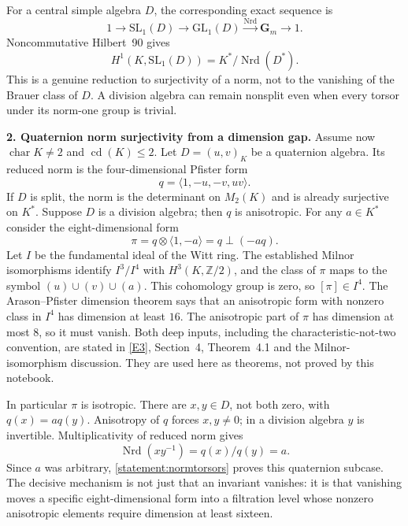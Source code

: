 \documentclass[11pt,a4paper]{article}
\newcommand{\Z}{\mathbb{Z}}
\newcommand{\eref}[2]{\hyperlink{extra:#1:#2}{[E#2]}}
\numberwithin{equation}{section}
\begin{document}
For a central simple algebra $D$, the corresponding exact sequence is
\[
 1\longrightarrow\mathrm{SL}_1(D)\longrightarrow\mathrm{GL}_1(D)
     \xrightarrow{\operatorname{Nrd}}\mathbf G_m\longrightarrow1.
\]
Noncommutative Hilbert~90 gives
\begin{equation}\label{statement:normtorsors}
 H^1(K,\mathrm{SL}_1(D))=K^*/\operatorname{Nrd}(D^*).
\end{equation}
This is a genuine reduction to surjectivity of a norm, not to the
vanishing of the Brauer class of $D$. A division algebra can remain
nonsplit even when every torsor under its norm-one group is trivial.

\textbf{2. Quaternion norm surjectivity from a dimension gap.}
Assume now $\operatorname{char}K\ne2$ and $\operatorname{cd}(K)\le2$.
Let $D=(u,v)_K$ be a quaternion algebra. Its reduced norm is the
four-dimensional Pfister form
\[
 q=\langle1,-u,-v,uv\rangle.
\]
If $D$ is split, the norm is the determinant on $M_2(K)$ and is already
surjective on $K^*$. Suppose $D$ is a division algebra; then $q$ is
anisotropic. For any $a\in K^*$ consider the eight-dimensional form
\[
 \pi=q\otimes\langle1,-a\rangle=q\perp(-a q).
\]
Let $I$ be the fundamental ideal of the Witt ring. The established
Milnor isomorphisms identify $I^3/I^4$ with
$H^3(K,\Z/2)$, and the class of $\pi$ maps to the symbol
$(u)\cup(v)\cup(a)$. This cohomology group is zero, so $[\pi]\in I^4$.
The Arason--Pfister dimension theorem says that an anisotropic form
with nonzero class in $I^4$ has dimension at least $16$.
The anisotropic part of $\pi$ has dimension at most $8$, so it must
vanish. Both deep inputs, including the characteristic-not-two
convention, are stated in \eref{statement}{3}, Section~4, Theorem~4.1 and the
Milnor-isomorphism discussion. They are used here as theorems, not
proved by this notebook.

In particular $\pi$ is isotropic. There are $x,y\in D$, not both zero,
with $q(x)=a q(y)$. Anisotropy of $q$ forces $x,y\ne0$; in a division
algebra $y$ is invertible. Multiplicativity of reduced norm gives
\begin{equation}\label{statement:ratio}
 \operatorname{Nrd}(xy^{-1})=q(x)/q(y)=a.
\end{equation}
Since $a$ was arbitrary, \eqref{statement:normtorsors} proves this quaternion
subcase. The decisive mechanism is not just that an invariant vanishes:
it is that vanishing moves a specific eight-dimensional form into a
filtration level whose nonzero anisotropic elements require dimension
at least sixteen.
\end{document}
